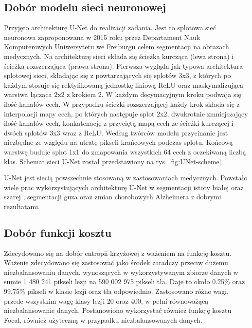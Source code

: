 \subsection{Dobór modelu sieci neuronowej}
\label{sec:nn-selection}
Przyjęto architekturę U-Net do realizacji zadania. Jest to splotowa sieć neuronowa zaproponowana w 2015 roku przez Departament Nauk Komputerowych Uniwersytetu we Freiburgu\cite{ronneberger2015unet} celem segmentacji na obrazach medycznych. Na architekturę sieci składa się ścieżka kurcząca (lewa strona) i ścieżka rozszerzająca (prawa strona). Pierwsza wygląda jak typowa architektura splotowej sieci, składając się z powtarzających się splotów 3x3, z których po każdym stosuje się rektyfikowaną jednostkę liniową ReLU oraz maskymalizująca warstwa łącząca  2x2 z krokiem 2. W każdym decymacyjnym kroku podwaja się ilość kanałów cech. W przypadku ścieżki rozszerzającej każdy krok składa się z interpolacji mapy cech, po których następuje splot 2x2, dwukrotnie zmniejszający ilość kanałów cech, konkatenację z przyciętą mapą cech ze ścieżki kurczącej i dwóch splotów 3x3 wraz z ReLU. Według twórców modelu przycinanie jest niezbędne ze względu na utratę pikseli krańcowych podczas splotu. Końcową warstwę buduje splot 1x1 do zmapowania wszystkich 64 cech z oczekiwaną liczbą klas. Schemat sieci U-Net został przedstawiony na rys. \ref{fig:UNet-scheme}.


\par
U-Net jest siecią powszechnie stosowaną w zastosowaniach medycznych. Powstało wiele prac wykorzystujących architekturę U-Net w segmentacji istoty białej oraz szarej \cite{PRZYBYSZEWSKI_KOHUT_2020}, segmentacji guza \cite{Ru2021} oraz zmian chorobowych Alzheimera\cite{Kavitha2019} z dobrymi rezultatami.





\label{sec:ModelSelection}
\subsection{Dobór funkcji kosztu}
\label{sec:choosing-of-cost-function}
\par
Zdecydowano się na dobór entropii krzyżowej z ważeniem na funkcję kosztu. Ważenie zdecydowano się zastosować jako środek zaradczy przeciw dużemu niezbalansowaniu danych, wynoszących w wykorzystywanym zbiorze danych w sumie  1 480 241 pikseli lezji na 590 002 975 pikseli tła. Daje to około 0.25\% oraz 99.75\% pikseli w klasie lezji oraz tła odpowiednio. Zastosowano różne wagi, przede wszystkim wagę klasy lezji 20 oraz 400, w pełni równoważącą niezbalansowanie danych. Postanowiono wykorzystać również funkcję kosztu Focal, również użyteczną w przypadku niezbalansowanych danych.


